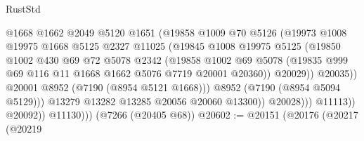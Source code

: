 \begin{lexlean}{RustStd}
\begin{coremodule}
                                @1668
                                @1662
                                @2049
                                @5120
                                @1651
                                (@19858
                                  @1009
                                  @70
                                  @5126
                                  (@19973
                                    @1008
                                    @19975
                                    @1668
                                    @5125
                                    @2327
                                    @11025
                                    (@19845
                                      @1008
                                      @19975
                                      @5125
                                      (@19850
                                        @1002
                                        @430
                                        @69
                                        @72
                                        @5078
                                        @2342
                                        (@19858
                                          @1002
                                          @69
                                          @5078
                                          (@19835
                                            @999
                                            @69
                                            @116
                                            @11
                                            @1668
                                            @1662
                                            @5076
                                            @7719
                                            @20001
                                            @20360))
                                        @20029))
                                    @20035))
                                @20001
                                @8952
                                (@7190 (@8954 @5121 @1668)))
                              @8952
                              (@7190 (@8954 @5094 @5129)))
                            @13279
                            @13282
                            @13285
                            @20056
                            @20060
                            @13300))
                        @20028)))
                  @11113))
              @20092))
          @11130)))
    (@7266 (@20405 @68))
@20602 := @20151
    (@20176
      (@20217
        (@20219

\end{coremodule}
\end{lexlean}

